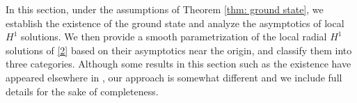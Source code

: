 \documentclass[12pt]{amsart}
\newcommand{\R}{\mathbb R}
\newcommand{\dha}{\dot H^1_a}
\newtheorem{theorem}{Theorem}[section]
\begin{document}
In this section, under the assumptions of Theorem \ref{thm: ground state}, we establish the existence of the ground state and analyze the asymptotics of local $H^1$ solutions. We then provide a smooth parametrization of the local radial $H^1$ solutions of \eqref{2} based on their asymptotics near the origin, and classify them into three categories. Although some results in this section such as the existence have appeared elsewhere in \cite{MNN21}, our approach is somewhat different and we include full details for the sake of completeness. 


%
%
%
%
\end{document}
